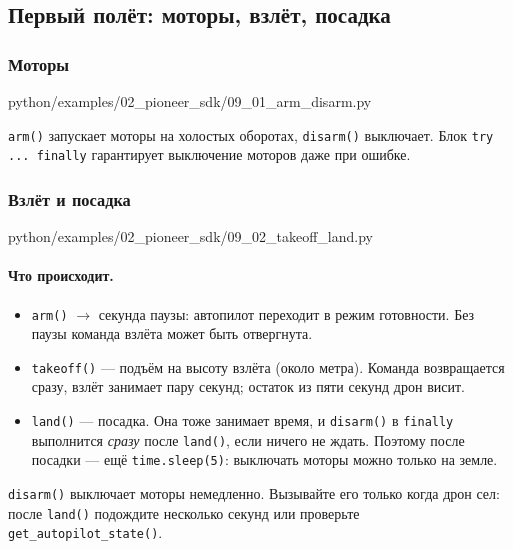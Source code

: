 \subsection{Первый полёт: моторы, взлёт, посадка}

\subsubsection*{Моторы}

\begin{codefile}[python]{python/examples/02_pioneer_sdk/09_01_arm_disarm.py}
\end{codefile}

\verb|arm()| запускает моторы на холостых оборотах, \verb|disarm()| выключает. Блок \verb|try ... finally| гарантирует выключение моторов даже при ошибке.

\subsubsection*{Взлёт и посадка}

\begin{codefile}[python]{python/examples/02_pioneer_sdk/09_02_takeoff_land.py}
\end{codefile}

\paragraph{Что происходит.}
\begin{itemize}
    \item \verb|arm()| $\to$ секунда паузы: автопилот переходит в режим готовности. Без паузы команда взлёта может быть отвергнута.
    \item \verb|takeoff()| --- подъём на высоту взлёта (около метра). Команда возвращается сразу, взлёт занимает пару секунд; остаток из пяти секунд дрон висит.
    \item \verb|land()| --- посадка. Она тоже занимает время, и \verb|disarm()| в \verb|finally| выполнится \emph{сразу} после \verb|land()|, если ничего не ждать. Поэтому после посадки --- ещё \verb|time.sleep(5)|: выключать моторы можно только на земле.
\end{itemize}

\begin{warnbox}
\verb|disarm()| выключает моторы немедленно. Вызывайте его только когда дрон сел: после \verb|land()| подождите несколько секунд или проверьте \verb|get_autopilot_state()|.
\end{warnbox}

